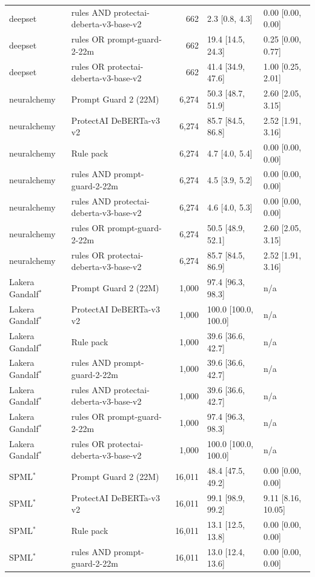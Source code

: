 \begin{tabular}{llrll}
deepset & rules AND protectai-deberta-v3-base-v2 & 662 & 2.3 [0.8, 4.3] & 0.00 [0.00, 0.00] \\
deepset & rules OR prompt-guard-2-22m & 662 & 19.4 [14.5, 24.3] & 0.25 [0.00, 0.77] \\
deepset & rules OR protectai-deberta-v3-base-v2 & 662 & 41.4 [34.9, 47.6] & 1.00 [0.25, 2.01] \\
neuralchemy & Prompt Guard 2 (22M) & 6,274 & 50.3 [48.7, 51.9] & 2.60 [2.05, 3.15] \\
neuralchemy & ProtectAI DeBERTa-v3 v2 & 6,274 & 85.7 [84.5, 86.8] & 2.52 [1.91, 3.16] \\
neuralchemy & Rule pack & 6,274 & 4.7 [4.0, 5.4] & 0.00 [0.00, 0.00] \\
neuralchemy & rules AND prompt-guard-2-22m & 6,274 & 4.5 [3.9, 5.2] & 0.00 [0.00, 0.00] \\
neuralchemy & rules AND protectai-deberta-v3-base-v2 & 6,274 & 4.6 [4.0, 5.3] & 0.00 [0.00, 0.00] \\
neuralchemy & rules OR prompt-guard-2-22m & 6,274 & 50.5 [48.9, 52.1] & 2.60 [2.05, 3.15] \\
neuralchemy & rules OR protectai-deberta-v3-base-v2 & 6,274 & 85.7 [84.5, 86.9] & 2.52 [1.91, 3.16] \\
Lakera Gandalf$^*$ & Prompt Guard 2 (22M) & 1,000 & 97.4 [96.3, 98.3] & n/a \\
Lakera Gandalf$^*$ & ProtectAI DeBERTa-v3 v2 & 1,000 & 100.0 [100.0, 100.0] & n/a \\
Lakera Gandalf$^*$ & Rule pack & 1,000 & 39.6 [36.6, 42.7] & n/a \\
Lakera Gandalf$^*$ & rules AND prompt-guard-2-22m & 1,000 & 39.6 [36.6, 42.7] & n/a \\
Lakera Gandalf$^*$ & rules AND protectai-deberta-v3-base-v2 & 1,000 & 39.6 [36.6, 42.7] & n/a \\
Lakera Gandalf$^*$ & rules OR prompt-guard-2-22m & 1,000 & 97.4 [96.3, 98.3] & n/a \\
Lakera Gandalf$^*$ & rules OR protectai-deberta-v3-base-v2 & 1,000 & 100.0 [100.0, 100.0] & n/a \\
SPML$^*$ & Prompt Guard 2 (22M) & 16,011 & 48.4 [47.5, 49.2] & 0.00 [0.00, 0.00] \\
SPML$^*$ & ProtectAI DeBERTa-v3 v2 & 16,011 & 99.1 [98.9, 99.2] & 9.11 [8.16, 10.05] \\
SPML$^*$ & Rule pack & 16,011 & 13.1 [12.5, 13.8] & 0.00 [0.00, 0.00] \\
SPML$^*$ & rules AND prompt-guard-2-22m & 16,011 & 13.0 [12.4, 13.6] & 0.00 [0.00, 0.00] \\

\end{tabular}
